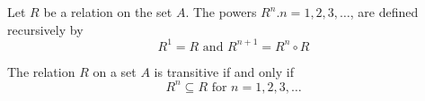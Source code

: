 \documentclass[../discrete.tex]{subfiles}
\begin{document}
\begin{definition}
    Let $R$ be a relation on the set $A$. The powers $R^n. n=1,2,3,\dots$, are defined recursively by 
    \[ R^1 = R \text{ and } R^{n+1}=R^n\circ R\]  
\end{definition}
\pagebreak 
\begin{theorem}
    The relation $R$ on a set $A$ is transitive if and only if 
    \[R^n \subseteq R \text{ for } n=1,2,3,\dots\]
\end{theorem}
\end{document}
